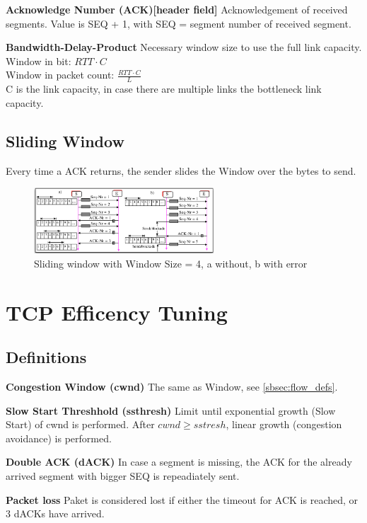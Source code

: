 \documentclass{article}
\begin{document}
\textbf{Acknowledge Number (ACK)[header field]}
Acknowledgement of received segments. Value is SEQ + 1, with SEQ = segment number of received segment.

\textbf{Bandwidth-Delay-Product} 
Necessary window size to use the full link capacity.\\
Window in bit: $RTT \cdot C$ \\
Window in packet count: $\frac{RTT \cdot C}{L}$ \\
C is the link capacity, in case there are multiple links the bottleneck link capacity.


\subsection{Sliding Window}
Every time a ACK returns, the sender slides the Window over the bytes to send.
\begin{figure}[h]
    \centering
    \includegraphics[width=0.6\textwidth]{media/sliding_window.png}
    \caption{Sliding window with Window Size = 4, a without, b with error}
    \label{fig:sliding}
\end{figure}


\section{TCP Efficency Tuning}
\subsection{Definitions}

\textbf{Congestion Window (cwnd)}
The same as Window, see \ref{sbsec:flow_defs}.

\textbf{Slow Start Threshhold (ssthresh)}
Limit until exponential growth (Slow Start) of cwnd is performed. After $cwnd \geq sstresh$, linear growth (congestion avoidance) is performed.

\textbf{Double ACK (dACK)}
In case a segment is missing, the ACK for the already arrived segment with bigger SEQ is repeadiately sent.

\textbf{Packet loss}
Paket is considered lost if either the timeout for ACK is reached, or 3 dACKs have arrived.
\end{document}
